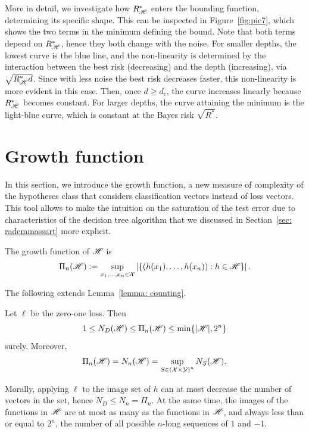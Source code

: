 \documentclass[reqno]{amsart}
\let\oldsection\section
\renewcommand{\section}{\clearpage\thispagestyle{plain}\oldsection}
\begin{document}
More in detail, we investigate how $R^*_{\mathscr{H}}$ enters the bounding function, determining its specific shape. This can be inspected in Figure~\ref{fig:pic7}, which shows the two terms in the minimum defining the bound. Note that both terms depend on $R^*_{\mathscr{H}}$, hence they both change with the noise. For smaller depths, the lowest curve is the blue line, and the non-linearity is determined by the interaction between the best risk (decreasing) and the depth (increasing), via $\sqrt{R^*_{\mathscr{H}} d}$. 
Since with less noise the best risk decreases faster, this non-linearity is more evident in this case. Then, once $d\ge d_c$, the curve increases linearly because $R^*_{\mathscr{H}}$ becomes constant. For larger depths, the curve attaining the minimum is the light-blue curve, which is constant at the Bayes risk $\sqrt{R^*}$.  

\newpage
\section{Growth function}\label{sec: growthf}

In this section, we introduce the growth function, a new measure of complexity of the hypotheses class that considers classification vectors instead of loss vectors. This tool allows to make the intuition on the saturation of the test error due to characteristics of the decision tree algorithm that we discussed in Section~\ref{sec: rademmassart} more explicit. 

\begin{definition}
The growth function of $\mathscr{H}$ is
\[
 \Pi_{n}(\mathscr{H}):=\sup_{x_1,\ldots,x_n\in\mathcal X}
 \left|\left\{(h(x_1),\ldots,h(x_n)):h\in\mathscr{H}\right\}\right|.
\]
\end{definition}

The following extends Lemma~\ref{lemma: counting}.

\begin{lemma}\label{lemma: growth}
Let $\ell$ be the zero-one loss. Then
\[
 1\le N_D(\mathscr{H})\le\Pi_{n}(\mathscr{H})\le\min\{\vert \mathscr{H} \vert,2^n\}
\]
surely. Moreover,
\[
\Pi_n(\mathscr{H})  = N_n(\mathscr{H}) = \sup_{S\in{(\mathcal{X}\times\mathcal{Y})}^n} N_S(\mathscr{H}).
\]
\end{lemma}

Morally, applying $\ell$ to the image set of $h$ can at most decrease the number of vectors in the set, hence $N_D\le N_n = \Pi_n$. At the same time, the images of the functions in $\mathscr{H}$ are at most as many as the functions in $\mathscr{H}$, and always less than or equal to $2^n$, the number of all possible $n$-long sequences of $1$ and $-1$.
\end{document}
